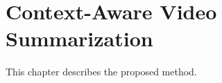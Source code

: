 \chapter{Context-Aware Video Summarization}
\label{chapter:method}

\begin{ChapAbstract}
    This chapter describes the proposed method.
\end{ChapAbstract}



